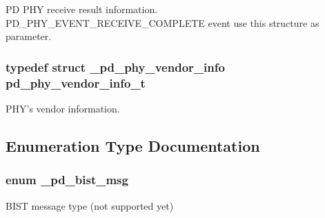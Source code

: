 P\-D P\-H\-Y receive result information. P\-D\-\_\-\-P\-H\-Y\-\_\-\-E\-V\-E\-N\-T\-\_\-\-R\-E\-C\-E\-I\-V\-E\-\_\-\-C\-O\-M\-P\-L\-E\-T\-E event use this structure as parameter. 

\hypertarget{group__usb__pd__phy__drv_ga4930ef145bdc6eb8fb43bb431eb305da}{
\subsubsection[{pd\-\_\-phy\-\_\-vendor\-\_\-info\-\_\-t}]{\setlength{\rightskip}{0pt plus 5cm}typedef struct {\bf \-\_\-pd\-\_\-phy\-\_\-vendor\-\_\-info}  {\bf pd\-\_\-phy\-\_\-vendor\-\_\-info\-\_\-t}}}\label{group__usb__pd__phy__drv_ga4930ef145bdc6eb8fb43bb431eb305da}


P\-H\-Y's vendor information. 



\subsection{Enumeration Type Documentation}
\hypertarget{group__usb__pd__phy__drv_ga6e9f5312eacb47634a8cb7a9ef88ea2e}{
\subsubsection[{\-\_\-pd\-\_\-bist\-\_\-msg}]{\setlength{\rightskip}{0pt plus 5cm}enum {\bf \-\_\-pd\-\_\-bist\-\_\-msg}}}\label{group__usb__pd__phy__drv_ga6e9f5312eacb47634a8cb7a9ef88ea2e}


B\-I\-S\-T message type (not supported yet) 

